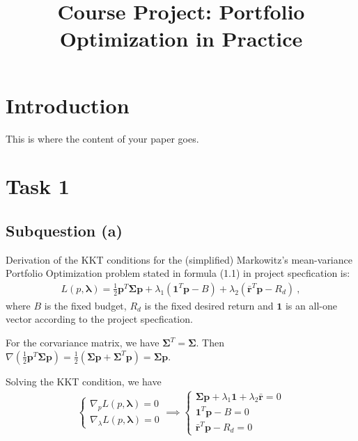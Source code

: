 \documentclass[12pt]{ftec2101}
\title{Course Project: Portfolio Optimization in Practice}
\newcommand{\vect}[1]{\mathbf{#1}}
\begin{document}
\maketitle


\section{Introduction}

This is where the content of your paper goes.

\section{Task 1}
\subsection{Subquestion (a)}
Derivation of the KKT conditions for the (simplified) Markowitz's mean-variance Portfolio Optimization problem stated in formula (1.1) in project specfication is:
\begin{align}
    L(p,\boldsymbol{\lambda}) = \frac{1}{2}\vect{p}^T\boldsymbol{\Sigma} \vect{p} + \lambda_{1} (\vect{1}^T \vect{p}-B) +\lambda_{2} (\bar{\vect{r}}^T \vect{p}-R_{d})\ ,
\end{align}
where $B$ is the fixed budget, $R_d$ is the fixed desired return and $\vect{1}$ is an all-one vector according to the project specfication.

\noindent
For the corvariance matrix, we have $\boldsymbol{\Sigma}^T = \boldsymbol{\Sigma}$. Then $\nabla \left(\frac{1}{2}\vect{p}^T \boldsymbol{\Sigma} \vect{p}\right) = \frac{1}{2}(\boldsymbol{\Sigma}\vect{p}+\boldsymbol{\Sigma}^T \vect{p}) = \boldsymbol{\Sigma}\vect{p}$. 

\noindent
Solving the KKT condition, we have
\begin{align}
    \begin{cases}
        \nabla_{p} L(p,\boldsymbol{\lambda}) = 0 \\
        \nabla_{\lambda} L(p,\boldsymbol{\lambda}) = 0
    \end{cases}
    \implies
    \begin{cases}
        \boldsymbol{\Sigma}\vect{p}+\lambda_1 \vect{1} + \lambda_2 \bar{\vect{r}} = 0 \\
        \vect{1}^T \vect{p} - B = 0 \\
        \bar{\vect{r}}^T \vect{p} - R_d = 0
    \end{cases}
    \label{KKT:1}
\end{align}
\end{document}

